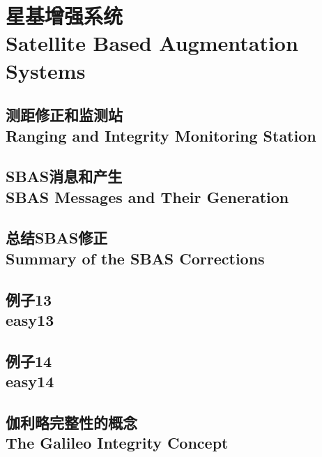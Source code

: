 \section[星基增强系统]{星基增强系统\\Satellite Based Augmentation Systems}
	
	\subsection[测距修正和检测站]{测距修正和监测站\\Ranging and Integrity Monitoring Station}
	
	\subsection[SBAS消息和产生]{SBAS消息和产生\\SBAS Messages and Their Generation}
	
	\subsection[总结SBAS修正]{总结SBAS修正\\Summary of the SBAS Corrections}
	
	\subsection[例子13]{例子13\\easy13}\label{subsec:easy13}
	
	\subsection[例子14]{例子14\\easy14}\label{subsec:easy14}
	
	\subsection[伽利略完整性的概念]{伽利略完整性的概念\\The Galileo Integrity Concept}
	
